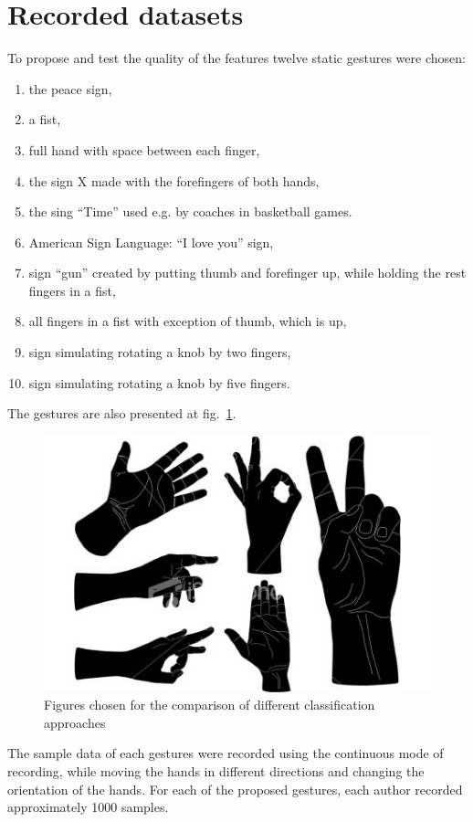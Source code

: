 \section{Recorded datasets}

To propose and test the quality of the features twelve static gestures were chosen:
\begin{enumerate}
\item the peace sign,
\item a fist,
\item full hand with space between each finger,
\item the sign X made with the forefingers of both hands,
\item the sing ``Time'' used e.g. by coaches in basketball games.
\item American Sign Language: ``I love you'' sign,
\item sign ``gun'' created by putting thumb and forefinger up, while holding the rest fingers in a fist,
\item all fingers in a fist with exception of thumb, which is up,
\item sign simulating rotating a knob by two fingers,
\item sign simulating rotating a knob by five fingers.
\end{enumerate} 
The gestures are also presented at fig.~\ref{staticgestures}.

\begin{figure}[htb]
\centering
 \includegraphics[width=0.6\columnwidth]{figures/static_gestures.jpg}
 \caption{Figures chosen for the comparison of different classification approaches}
 \label{staticgestures}
\end{figure}

The sample data of each gestures were recorded using the continuous mode of recording, while moving the hands in different directions and changing the orientation of the hands. 
For each of the proposed gestures, each author recorded approximately 1000 samples.


